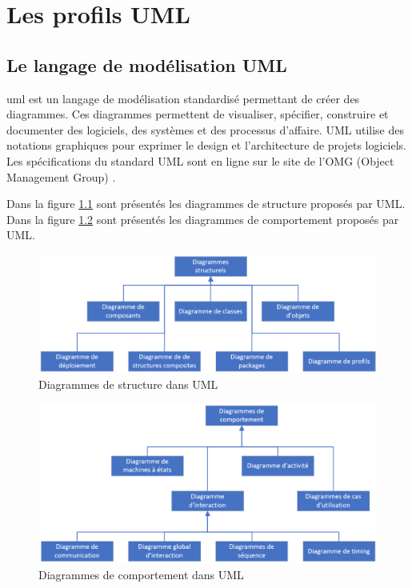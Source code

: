 \chapter{Les profils UML}
\label{profils-UML.sect}
\section{Le langage de modélisation UML}
\gls{uml} est un langage de modélisation standardisé permettant de créer des diagrammes.
Ces diagrammes permettent de visualiser, spécifier, construire et documenter des logiciels, des systèmes et des processus d'affaire.
UML utilise des notations graphiques pour exprimer le design et l'architecture de projets logiciels.
Les spécifications du standard UML sont en ligne sur le site de l'OMG (Object Management Group)  \cite{OMG_UML}.

Dans la figure \ref{fig.uml_struc} sont présentés les diagrammes de structure proposés par UML.
Dans la figure \ref{fig.uml_comp} sont présentés les diagrammes de comportement proposés par UML.

\begin{figure}[H]
    \centering
    \includegraphics[width=12cm]{10_img/chap4/structure.PNG}
    \caption{Diagrammes de structure dans UML \cite{OMG_UML}}
    \label{fig.uml_struc}
\end{figure}

\begin{figure}[H]
    \centering
    \includegraphics[width=12cm]{10_img/chap4/comportement.PNG}
    \caption{Diagrammes de comportement dans UML \cite{OMG_UML}}
    \label{fig.uml_comp}
\end{figure}

